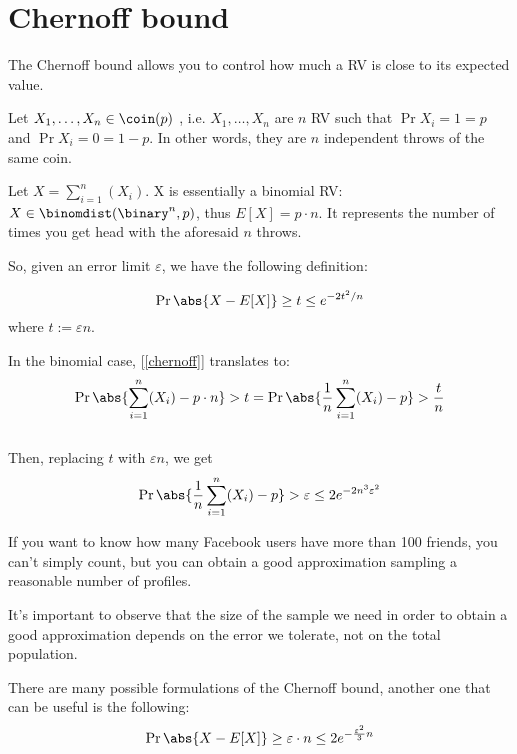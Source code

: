 \chapter{Chernoff bound}

	The Chernoff bound allows you to control how much a RV is close to its expected value.

	Let $X_1, \dots, X_n \in \coin(p)$ \iid, i.e. $X_1, \dots, X_n$ are $n$ RV such that $\Pr{X_i=1} = p$ and $\Pr{X_i=0}=1-p$.
	In other words, they are $n$ independent throws of the same coin.
	
	Let $X=\sum_{i=1}^{n}(X_i)$.
	X is essentially a binomial RV: $X \in \binomdist(\binary^n, p)$, thus $E[X]=p\cdot n$. It represents the number of times you get head with the aforesaid $n$ throws.
	
	So, given an error limit $\varepsilon$, we have the following definition:
    \begin{defn}
       	\begin{equation} \label{chernoff}  %
            \Pr{\abs{X-E[X]} \geq t} \leq e^{-2t^2/n}
        \end{equation}
        where $t := \varepsilon n$.
    \end{defn}
	
	In the binomial case, [\ref{chernoff}] translates to:
	\begin{equation*}
	\Pr{\abs{\sum_{i=1}^{n}(X_i) - p \cdot n} > t} = \Pr{\abs{\frac{1}{n}\sum_{i=1}^{n}(X_i) - p} > \frac{t}{n}}
	\end{equation*}
	\\
	Then, replacing $t$ with $\varepsilon n$, we get %
	\begin{equation}
		\Pr{\abs{\frac{1}{n}\sum_{i=1}^{n}(X_i) - p} > \varepsilon} \leq 2e^{-2n^3\varepsilon^2}
	\end{equation} %
	
	\ex If you want to know how many Facebook users have more than 100 friends, you can't simply count, but you can obtain a good approximation sampling a reasonable number of profiles.
	
	\obs It's important to observe that the size of the sample we need in order to obtain a good approximation depends on the error we tolerate, not on the total population.
	
	There are many possible formulations of the Chernoff bound, another one that can be useful is the following:
	\begin{equation}\label{chernoff2}
	\Pr{\abs{X-E[X]} \geq \varepsilon \cdot n} \leq 2e^{-\frac{\varepsilon^{2}}{3}n}
	\end{equation}
	
